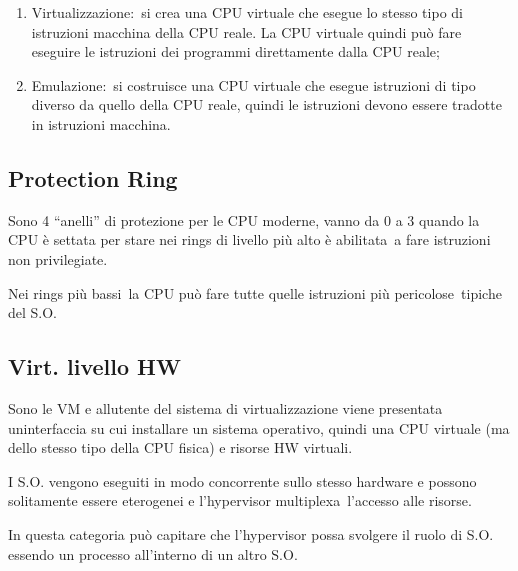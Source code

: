 \documentclass[
]{article}
\providecommand{\tightlist}{%
  \setlength{\itemsep}{0pt}\setlength{\parskip}{0pt}}
\begin{document}
{}

\begin{enumerate}
\tightlist
\item
  {Virtualizzazione}{:}{~si crea una CPU virtuale che esegue lo stesso
  tipo di istruzioni macchina della CPU reale. La CPU virtuale quindi
  può fare eseguire le istruzioni dei programmi direttamente dalla CPU
  reale}{;}
\end{enumerate}

{}

\begin{enumerate}
\setcounter{enumi}{1}
\tightlist
\item
  {Emulazione}{:}{~si costruisce una CPU virtuale che esegue istruzioni
  di tipo diverso da quello della CPU reale, quindi le istruzioni devono
  essere tradotte in istruzioni macchina.}
\end{enumerate}

{}

\subsection{\texorpdfstring{{Protection
Ring}}{Protection Ring}}\label{h.q8pjxvtrenj9}

{Sono 4 ``anelli'' di protezione per le CPU moderne, vanno da 0 a 3
quando la CPU è settata per stare nei rings di livello più }{alto è
abilitata}{~a fare istruzioni non privilegiate.}

{Nei rings più bassi}{~la CPU può fare tutte quelle }{istruzioni più
pericolose}{~tipiche del S.O.}

\subsection{\texorpdfstring{{Virt. livello
HW}}{Virt. livello HW}}\label{h.ipmu7njsj3v2}

{Sono le VM e all\textquotesingle utente del sistema di virtualizzazione
viene presentata un\textquotesingle interfaccia su cui installare un
sistema operativo, quindi una CPU virtuale (ma dello stesso tipo della
CPU fisica) e risorse HW virtuali.}

{I S.O. vengono eseguiti in modo concorrente sullo stesso hardware e
possono solitamente essere eterogenei e l'hypervisor
}{multiplexa}{~l'accesso alle risorse.}

{In questa categoria può capitare che l'hypervisor possa svolgere il
ruolo di S.O. essendo un processo all'interno di un altro S.O.}
\end{document}
